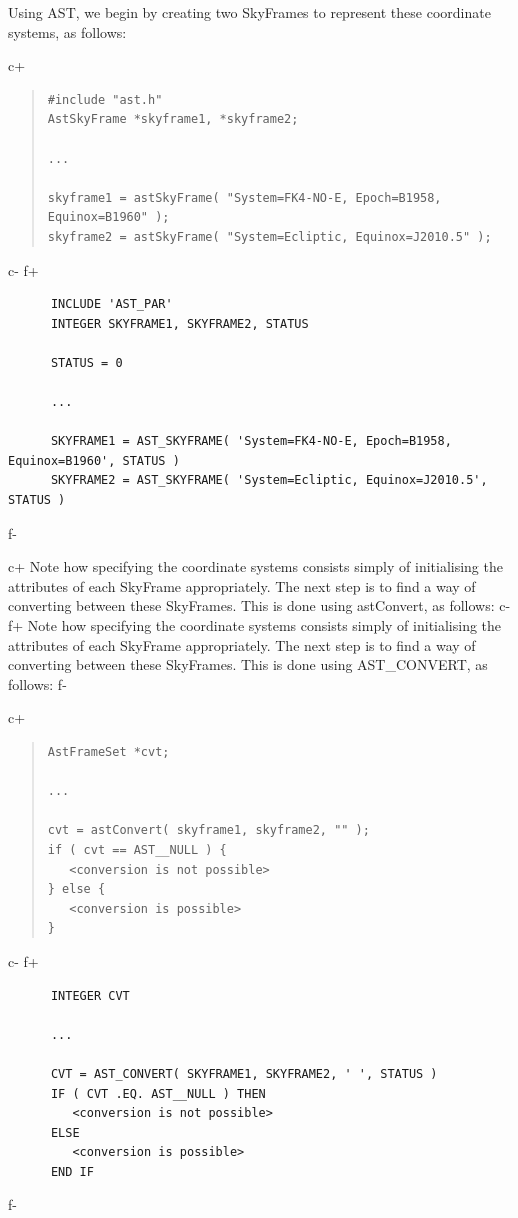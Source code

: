 \documentclass[twoside,11pt]{article}
\begin{document}
Using AST, we begin by creating two SkyFrames to represent these
coordinate systems, as follows:

c+
\begin{quote}
\small
\begin{verbatim}
#include "ast.h"
AstSkyFrame *skyframe1, *skyframe2;

...

skyframe1 = astSkyFrame( "System=FK4-NO-E, Epoch=B1958, Equinox=B1960" );
skyframe2 = astSkyFrame( "System=Ecliptic, Equinox=J2010.5" );
\end{verbatim}
\normalsize
\end{quote}
c-
f+
\small
\begin{verbatim}
      INCLUDE 'AST_PAR'
      INTEGER SKYFRAME1, SKYFRAME2, STATUS

      STATUS = 0

      ...

      SKYFRAME1 = AST_SKYFRAME( 'System=FK4-NO-E, Epoch=B1958, Equinox=B1960', STATUS )
      SKYFRAME2 = AST_SKYFRAME( 'System=Ecliptic, Equinox=J2010.5', STATUS )
\end{verbatim}
\normalsize
f-

c+
Note how specifying the coordinate systems consists simply of
initialising the attributes of each SkyFrame appropriately.  The next
step is to find a way of converting between these SkyFrames. This is
done using astConvert, as follows:
c-
f+
Note how specifying the coordinate systems consists simply of
initialising the attributes of each SkyFrame appropriately.  The next
step is to find a way of converting between these SkyFrames. This is
done using AST\_CONVERT, as follows:
f-

c+
\begin{quote}
\small
\begin{verbatim}
AstFrameSet *cvt;

...

cvt = astConvert( skyframe1, skyframe2, "" );
if ( cvt == AST__NULL ) {
   <conversion is not possible>
} else {
   <conversion is possible>
}
\end{verbatim}
\normalsize
\end{quote}
c-
f+
\small
\begin{verbatim}
      INTEGER CVT

      ...

      CVT = AST_CONVERT( SKYFRAME1, SKYFRAME2, ' ', STATUS )
      IF ( CVT .EQ. AST__NULL ) THEN
         <conversion is not possible>
      ELSE
         <conversion is possible>
      END IF
\end{verbatim}
\normalsize
f-
\end{document}
